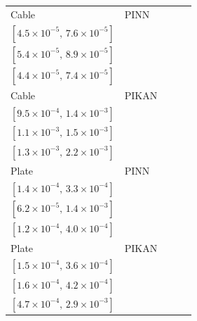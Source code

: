 \begin{tabular}{llccc}
Cable & PINN & \makecell{$5.8{\times}10^{-5}$\\$[4.5{\times}10^{-5},\,7.6{\times}10^{-5}]$} & \makecell{$6.9{\times}10^{-5}$\\$[5.4{\times}10^{-5},\,8.9{\times}10^{-5}]$} & \makecell{$5.7{\times}10^{-5}$\\$[4.4{\times}10^{-5},\,7.4{\times}10^{-5}]$}\\
Cable & PIKAN & \makecell{$\mathbf{1.2{\times}10^{-3}}$\\$[9.5{\times}10^{-4},\,1.4{\times}10^{-3}]$} & \makecell{$1.3{\times}10^{-3}$\\$[1.1{\times}10^{-3},\,1.5{\times}10^{-3}]$} & \makecell{$1.7{\times}10^{-3}$\\$[1.3{\times}10^{-3},\,2.2{\times}10^{-3}]$}\\
Plate & PINN & \makecell{$2.1{\times}10^{-4}$\\$[1.4{\times}10^{-4},\,3.3{\times}10^{-4}]$} & \makecell{$3.0{\times}10^{-4}$\\$[6.2{\times}10^{-5},\,1.4{\times}10^{-3}]$} & \makecell{$2.2{\times}10^{-4}$\\$[1.2{\times}10^{-4},\,4.0{\times}10^{-4}]$}\\
Plate & PIKAN & \makecell{$2.4{\times}10^{-4}$\\$[1.5{\times}10^{-4},\,3.6{\times}10^{-4}]$} & \makecell{$2.6{\times}10^{-4}$\\$[1.6{\times}10^{-4},\,4.2{\times}10^{-4}]$} & \makecell{$1.2{\times}10^{-3}$\\$[4.7{\times}10^{-4},\,2.9{\times}10^{-3}]$}\\
\bottomrule
\end{tabular}